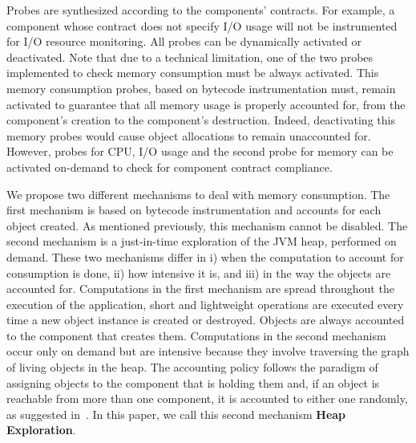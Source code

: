 Probes are synthesized according to the components' contracts.
For example, a component whose contract does not specify I/O usage will not be instrumented for I/O resource monitoring.
All probes can be dynamically activated or deactivated.
Note that due to a technical limitation, one of the two probes implemented to check memory consumption must be always activated.  
This memory consumption probes, based on bytecode instrumentation must, remain activated to guarantee that all memory usage is properly accounted for, from the component's creation to the component's destruction.
Indeed, deactivating this memory probes would cause object allocations to remain unaccounted for.
However, probes for CPU, I/O usage and the second probe for memory can be activated on-demand to check for component contract compliance.

We propose two different mechanisms to deal with memory consumption.
The first mechanism is based on bytecode instrumentation and accounts for each object created. 
As mentioned previously, this mechanism cannot be disabled.
The second mechanism is a just-in-time exploration of the JVM heap, performed on demand.
These two mechanisms differ in i) when the computation to account for consumption is done, ii) how intensive it is, and iii) in the way the objects are accounted for.
Computations in the first mechanism are spread throughout the execution of the application, short and lightweight operations are executed every time a new object instance is created or destroyed.
Objects are always accounted to the component that creates them.
Computations in the second mechanism occur only on demand but are intensive because they involve traversing the graph of living objects in the heap.
The accounting policy follows the paradigm of assigning objects to the component that is holding them and, if an object is reachable from more than one component, it is accounted to either one randomly, as suggested in~\cite{Geoffray5270296}.
In this paper, we call this second mechanism \textbf{Heap Exploration}.



